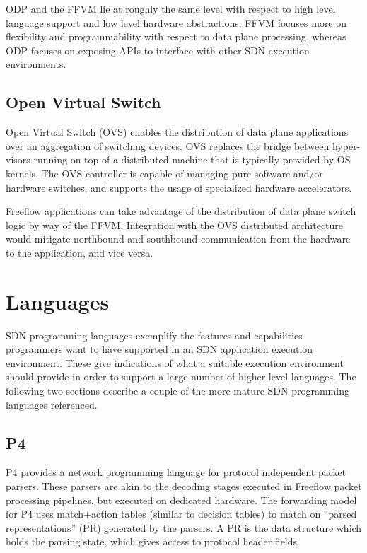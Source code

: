 ODP and the FFVM lie at roughly the same level with respect to high level
language support and low level hardware abstractions. FFVM focuses more on
flexibility and programmability with respect to data plane processing, whereas
ODP focuses on exposing APIs to interface with other SDN execution environments.

\subsection{Open Virtual Switch}
\label{related:ovs}
Open Virtual Switch (OVS) \cite{ovs} enables the distribution of data
plane applications over an aggregation of switching devices. OVS replaces
the bridge between hyper-visors running on top of a distributed machine that
is typically provided by OS kernels. The OVS controller is capable of managing
pure software and/or hardware switches, and supports the usage of specialized
hardware accelerators.

Freeflow applications can take advantage of the distribution of data plane
switch logic by way of the FFVM. Integration with the OVS distributed
architecture would mitigate northbound and southbound communication from the
hardware to the application, and vice versa.

\section{Languages}
\label{related:lang}
SDN programming languages exemplify the features and capabilities programmers
want to have supported in an SDN application execution environment. These give
indications of what a suitable execution environment should provide in order
to support a large number of higher level languages. The following two sections
describe a couple of the more mature SDN programming languages referenced.

\subsection{P4}
\label{related:p4}
P4 \cite{p4} provides a network programming language for protocol independent
packet parsers. These parsers are akin to the decoding stages executed in
Freeflow packet processing pipelines, but executed on dedicated hardware. The
forwarding model for P4 uses match+action tables (similar to decision tables) to
match on ``parsed representations'' (PR) generated by the parsers. A PR is the
data structure which holds the parsing state, which gives access to protocol
header fields.

